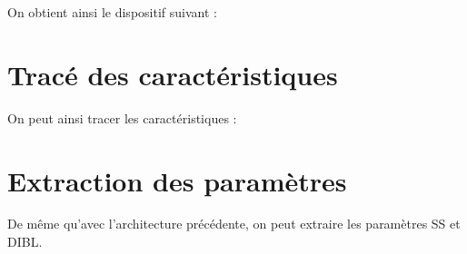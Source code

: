 \documentclass[a4paper,11pt]{report}
\begin{document}
On obtient ainsi le dispositif suivant :



\section{Tracé des caractéristiques}

On peut ainsi tracer les caractéristiques :

\section{Extraction des paramètres}

De même qu'avec l'architecture précédente, on peut extraire les paramètres SS et DIBL.


\end{document}
